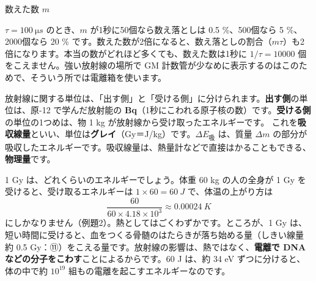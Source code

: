 \begin{phbaisuru}{数えた数 $m$}
\noindent\begin{minipage}[c]{0.46\linewidth}\raggedright
$\tau=\qty{100}{\micro s}$ のとき、$m$ が1秒に50個なら数え落としは 0.5 \%、500個なら 5 \%、2000個なら 20 \% です。数えた数が2倍になると、数え落としの割合（$m\tau$）も2倍になります。本当の数がどれほど多くても、数えた数は1秒に $1/\tau=\num{10000}$ 個をこえません。強い放射線の場所で GM 計数管が少なめに表示するのはこのためで、そういう所では電離箱を使います。
\end{minipage}\hfill
\begin{minipage}[c]{0.50\linewidth}\centering
{}
\end{minipage}
\end{phbaisuru}

\label{ph:原-14:sec4}
放射線に関する単位は、「出す側」と「受ける側」に分けられます。\textbf{出す側}の単位は、原-12 で学んだ放射能の \textbf{Bq}（1秒にこわれる原子核の数）です。\textbf{受ける側}の単位の1つめは、物 1 kg が放射線から受け取ったエネルギーです。
\label{ph:原-14:Gy}これを\textbf{吸収線量}といい、単位は\textbf{グレイ}（Gy＝J/kg）です。$\Delta E_{\text{吸}}$ は、質量 $\Delta m$ の部分が吸収したエネルギーです。吸収線量は、熱量計などで直接はかることもできる、\textbf{物理量}です。

1 Gy は、どれくらいのエネルギーでしょう。体重 60 kg の人の全身が 1 Gy を受けると、受け取るエネルギーは $1\times60=\qty{60}{J}$ で、体温の上がり方は
\[ \frac{60}{60\times4.18\times10^3}\approx\qty{0.00024}{K} \]
にしかなりません（例題2）。熱としてはごくわずかです。ところが、1 Gy は、短い時間に受けると、血をつくる骨髄のはたらきが落ち始める量（しきい線量 約 0.5 Gy：⑪）をこえる量です。放射線の影響は、熱ではなく、\textbf{電離で DNA などの分子をこわす}ことによるからです。60 J は、約 34 eV ずつに分けると、体の中で約 $10^{19}$ 組もの電離を起こすエネルギーなのです。

